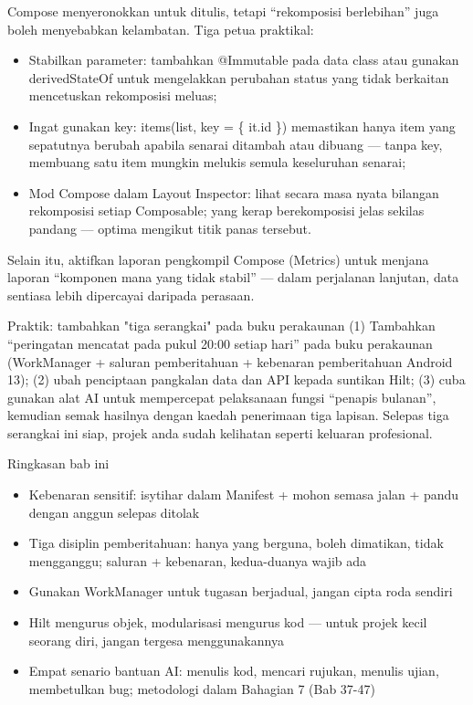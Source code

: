 
Compose menyeronokkan untuk ditulis, tetapi “rekomposisi berlebihan” juga boleh menyebabkan kelambatan. Tiga petua praktikal:

\begin{itemize}
  \item Stabilkan parameter: tambahkan @Immutable pada data class atau gunakan derivedStateOf untuk mengelakkan perubahan status yang tidak berkaitan mencetuskan rekomposisi meluas;
  \item Ingat gunakan key: items(list, key = \{ it.id \}) memastikan hanya item yang sepatutnya berubah apabila senarai ditambah atau dibuang — tanpa key, membuang satu item mungkin melukis semula keseluruhan senarai;
  \item Mod Compose dalam Layout Inspector: lihat secara masa nyata bilangan rekomposisi setiap Composable; yang kerap berekomposisi jelas sekilas pandang — optima mengikut titik panas tersebut.
\end{itemize}

Selain itu, aktifkan laporan pengkompil Compose (Metrics) untuk menjana laporan “komponen mana yang tidak stabil” — dalam perjalanan lanjutan, data sentiasa lebih dipercayai daripada perasaan.

\begin{tcbpractice}{Praktik: tambahkan "tiga serangkai" pada buku perakaunan}
(1) Tambahkan “peringatan mencatat pada pukul 20:00 setiap hari” pada buku perakaunan (WorkManager + saluran pemberitahuan + kebenaran pemberitahuan Android 13); (2) ubah penciptaan pangkalan data dan API kepada suntikan Hilt; (3) cuba gunakan alat AI untuk mempercepat pelaksanaan fungsi “penapis bulanan”, kemudian semak hasilnya dengan kaedah penerimaan tiga lapisan. Selepas tiga serangkai ini siap, projek anda sudah kelihatan seperti keluaran profesional.

\end{tcbpractice}

\begin{tcbsummary}{Ringkasan bab ini}
\begin{itemize}
  \item Kebenaran sensitif: isytihar dalam Manifest + mohon semasa jalan + pandu dengan anggun selepas ditolak
  \item Tiga disiplin pemberitahuan: hanya yang berguna, boleh dimatikan, tidak mengganggu; saluran + kebenaran, kedua-duanya wajib ada
  \item Gunakan WorkManager untuk tugasan berjadual, jangan cipta roda sendiri
  \item Hilt mengurus objek, modularisasi mengurus kod — untuk projek kecil seorang diri, jangan tergesa menggunakannya
  \item Empat senario bantuan AI: menulis kod, mencari rujukan, menulis ujian, membetulkan bug; metodologi dalam Bahagian 7 (Bab 37-47)
\end{itemize}

\end{tcbsummary}
